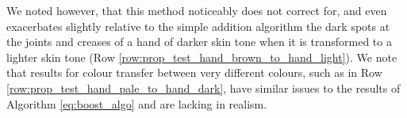 We noted however, that this method noticeably does not correct for, and even exacerbates slightly relative to the simple addition algorithm the dark spots at the joints and creases of a hand of darker skin tone when it is transformed to a lighter skin tone (Row \ref{row:prop_test_hand_brown_to_hand_light}). We note that results for colour transfer between very different colours, such as in Row \ref{row:prop_test_hand_pale_to_hand_dark}, have similar issues to the results of Algorithm \ref{eq:boost_algo} and are lacking in realism.
